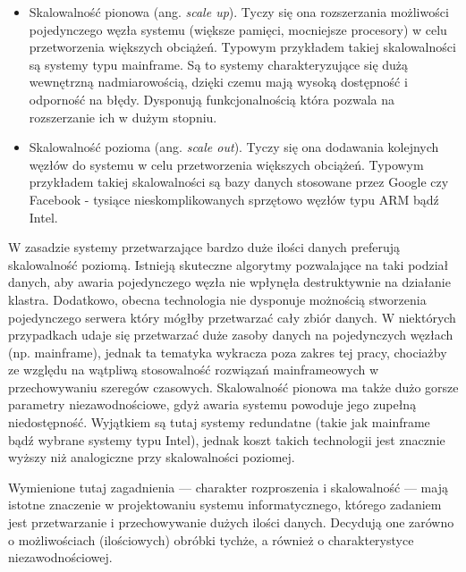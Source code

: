 \documentclass[a4paper,polish,12pt,twoside]{article}
\begin{document}
	\begin{itemize}
		\item Skalowalność pionowa (ang. \textit{scale up}). Tyczy się ona rozszerzania możliwości pojedynczego węzła systemu (większe pamięci, mocniejsze procesory) w celu przetworzenia większych obciążeń. Typowym przykładem takiej skalowalności są systemy typu mainframe. Są to systemy charakteryzujące się dużą wewnętrzną nadmiarowością, dzięki czemu mają wysoką dostępność i odporność na błędy. Dysponują funkcjonalnością która pozwala na rozszerzanie ich w dużym stopniu.
		\item Skalowalność pozioma (ang. \textit{scale out}). Tyczy się ona dodawania kolejnych węzłów do systemu w celu przetworzenia większych obciążeń. Typowym przykładem takiej skalowalności są bazy danych stosowane przez Google czy Facebook - tysiące nieskomplikowanych sprzętowo węzłów typu ARM bądź Intel.
	\end{itemize}

	W zasadzie systemy przetwarzające bardzo duże ilości danych preferują skalowalność poziomą. Istnieją skuteczne algorytmy pozwalające na taki podział danych, aby awaria pojedynczego węzła nie wpłynęła destruktywnie na działanie klastra. Dodatkowo, obecna technologia nie dysponuje możnością stworzenia pojedynczego serwera który mógłby przetwarzać cały zbiór danych. W niektórych przypadkach udaje się przetwarzać duże zasoby danych na pojedynczych węzłach (np. mainframe), jednak ta tematyka wykracza poza zakres tej pracy, chociażby ze względu na wątpliwą stosowalność rozwiązań mainframeowych w przechowywaniu szeregów czasowych. Skalowalność pionowa ma także dużo gorsze parametry niezawodnościowe, gdyż awaria systemu powoduje jego zupełną niedostępność. Wyjątkiem są tutaj systemy redundatne (takie jak mainframe bądź wybrane systemy typu Intel), jednak koszt takich technologii jest znacznie wyższy niż analogiczne przy skalowalności poziomej.

Wymienione tutaj zagadnienia --- charakter rozproszenia i skalowalność --- mają istotne znaczenie w projektowaniu systemu informatycznego, którego zadaniem jest przetwarzanie i przechowywanie dużych ilości danych. Decydują one zarówno o możliwościach (ilościowych) obróbki tychże, a również o charakterystyce niezawodnościowej.
\end{document}
